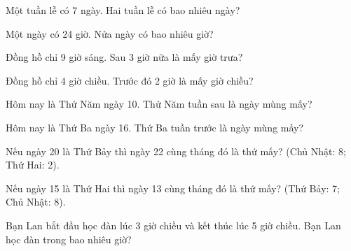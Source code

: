 \begin{ex}
Một tuần lễ có 7 ngày. Hai tuần lễ có bao nhiêu ngày?
\end{ex}

\begin{ex}
Một ngày có 24 giờ. Nửa ngày có bao nhiêu giờ?
\end{ex}

\begin{ex}
Đồng hồ chỉ 9 giờ sáng. Sau 3 giờ nữa là mấy giờ trưa?
\end{ex}

\begin{ex}
Đồng hồ chỉ 4 giờ chiều. Trước đó 2 giờ là mấy giờ chiều?
\end{ex}

\begin{ex}
Hôm nay là Thứ Năm ngày 10. Thứ Năm tuần sau là ngày mùng mấy?
\end{ex}

\begin{ex}
Hôm nay là Thứ Ba ngày 16. Thứ Ba tuần trước là ngày mùng mấy?
\end{ex}

\begin{ex}
Nếu ngày 20 là Thứ Bảy thì ngày 22 cùng tháng đó là thứ mấy? (Chủ Nhật: 8; Thứ Hai: 2).
\end{ex}

\begin{ex}
Nếu ngày 15 là Thứ Hai thì ngày 13 cùng tháng đó là thứ mấy? (Thứ Bảy: 7; Chủ Nhật: 8).
\end{ex}

\begin{ex}
Bạn Lan bắt đầu học đàn lúc 3 giờ chiều và kết thúc lúc 5 giờ chiều. Bạn Lan học đàn trong bao nhiêu giờ?
\end{ex}

